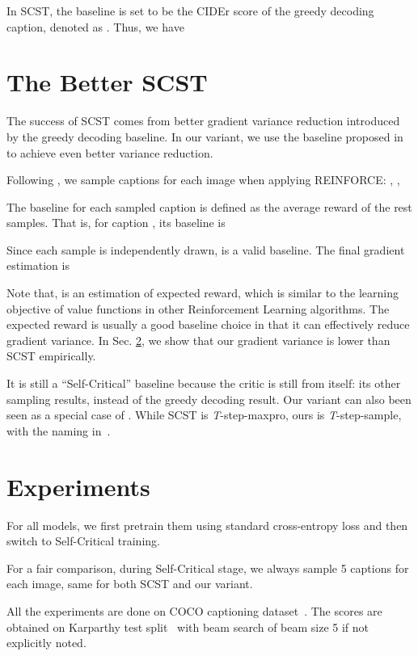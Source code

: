 \documentclass[11pt,a4paper]{article}
\begin{document}
In SCST, the baseline is set to be the CIDEr score of the greedy decoding caption, denoted as . Thus, we have



\section{The Better SCST}\label{sec:nsc}

The success of SCST comes from better gradient variance reduction introduced by the greedy decoding baseline. In our variant, we use the baseline proposed in \cite{mnih2016variational} to achieve even better variance reduction.

Following \cite{mnih2016variational}, we sample  captions for each image when applying REINFORCE: , , 

The baseline for each sampled caption is defined as the average reward of the rest samples. That is, for caption , its baseline is 

Since each sample is independently drawn,  is a valid baseline. The final gradient estimation is 

Note that,  is an estimation of expected reward, which is similar to the learning objective of value functions in other Reinforcement Learning algorithms. The expected reward is usually a good baseline choice in that it can effectively reduce gradient variance. In Sec. \ref{sec:exp}, we show that our gradient variance is lower than SCST empirically.

It is still a ``Self-Critical'' baseline because the critic is still from itself: its other sampling results, instead of the greedy decoding result. Our variant can also been seen as a special case of \cite{gao2019self}. While SCST is {\it T}-step-maxpro, ours is {\it T}-step-sample, with the naming in~\cite{gao2019self}.

\section{Experiments}\label{sec:exp}
For all models, we first pretrain them using standard cross-entropy loss and then switch to Self-Critical training.

For a fair comparison, during Self-Critical stage, we always sample 5 captions for each image, same for both SCST and our variant.

All the experiments are done on COCO captioning dataset~\cite{lin2014microsoft}. The scores are obtained on Karparthy test split~\cite{karpathy2015deep} with beam search of beam size 5 if not explicitly noted.
\end{document}
